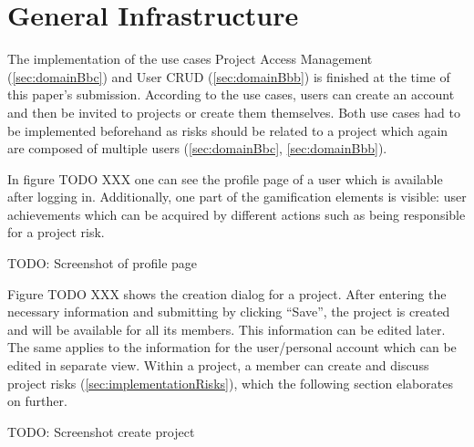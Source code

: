 \section{General Infrastructure}
\label{sec:implementationInfra}

The implementation of the use cases Project Access Management (\ref{sec:domainBbc}) and User CRUD (\ref{sec:domainBbb}) is finished at the time of this paper's submission. According to the use cases, users can create an account and then be invited to projects or create them themselves. Both use cases had to be implemented beforehand as risks should be related to a project which again are composed of multiple users (\ref{sec:domainBbc}, \ref{sec:domainBbb}).

In figure TODO XXX one can see the profile page of a user which is available after logging in. Additionally, one part of the gamification elements is visible: user achievements which can be acquired by different actions such as being responsible for a project risk.

TODO: Screenshot of profile page

Figure TODO XXX shows the creation dialog for a project. After entering the necessary information and submitting by clicking “Save”, the project is created and will be available for all its members. This information can be edited later. The same applies to the information for the user/personal account which can be edited in separate view. Within a project, a member can create and discuss project risks (\ref{sec:implementationRisks}), which the following section elaborates on further.

TODO: Screenshot create project



